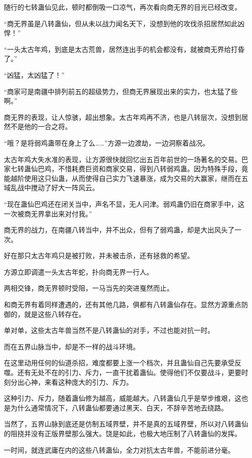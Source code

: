\begin{this_body}
随行的七转蛊仙见此，顿时都倒吸一口凉气，再次看向商无界的目光已经改变。

“商无界虽是八转蛊仙，但从未以战力闻名天下，没想到他的攻伐杀招居然如此凶悍！”

“一头太古年鸡，到底是太古荒兽，居然连出手的机会都没有，就被商无界给打昏了。”

“凶猛，太凶猛了！”

“商家可是南疆中排列前五的超级势力，但商无界展现出来的实力，也太猛了些啊。”

商无界的表现，让人惊骇，超出想象。太古年鸡再不济，也是八转层次，没想到居然不是他的一合之将。

“哦？是将弱鸡蛊带在身上了么……”方源一边渡劫，一边洞察着战况。

太古年鸡大失水准的表现，让方源很快就回忆出五百年前世的一场著名的交易。巴家七转蛊仙巴鸡，不惜耗费巨资和商家交易，得到八转弱鸡蛊。因为特殊手段，竟能越阶使用这只仙蛊，从而使得自己实力飞速暴涨，成为交易的大赢家，继而在五域乱战中搅动了好大一阵风云。

“现在蛊仙巴鸡还在闭关当中，声名不显，无人问津。弱鸡蛊仍旧在商家手中，这一次被商无界拿出来对付我。”

商无界的战力，在南疆八转当中，并不出众，但有了弱鸡蛊，却是大出风头了一次。

好在那只太古年鸡只是被打败，并未被击杀，还有拯救的希望。

方源立即调遣一头太古年蛇，扑向商无界一行人。

两相交锋，商无界顿时受阻，一马当先的突进戛然而止。

和商无界有着同样遭遇的，还有其他几路，俱都有八转蛊仙存在。显然方源重点防御的，就是这些八转存在。

单对单，这些太古年兽当然不是八转蛊仙的对手，不过也能对抗一时。

而在五界山脉当中，却是不一样的战斗环境。

在这里动用任何的仙道杀招，难度都要上涨一个档次，并且蛊仙自己先要承受反噬。还有无处不在的引力、斥力，一直干扰着蛊仙。使得他们不仅要战斗，更要时刻分出心神，来看这种庞大的引力、斥力。

这种引力、斥力，随着蛊仙修为越高，威能越大。八转蛊仙几乎是举步维艰，这也是为什么通常情况下，八转蛊仙都要通过黑天、白天，不辞辛苦地去绕路。

当然了，五界山脉到底还是仿制五域界壁，并不是真的五域界壁，所以对八转蛊仙的阻挠并没有正版界壁那么强大。饶是如此，也极大地压制了八转蛊仙的发挥。

一时间，就连武庸在内的这些八转蛊仙，全力对抗太古年兽，不能前进分毫。


\end{this_body}
